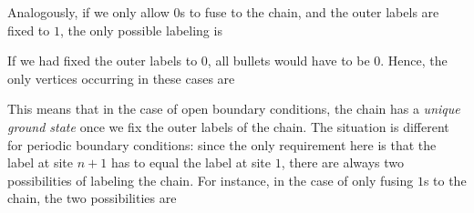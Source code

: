 \noindent
Analogously, if we only allow $0$s to fuse to the chain, and the outer labels are fixed to $1$, the only possible labeling is 
	\begin{figure}[H]
	\end{figure}
	\noindent
If we had fixed the outer labels to $0$, all bullets would have to be $0$. Hence, the only vertices occurring in these cases are
	\begin{figure}[H]	
		\hspace{20pt}
	\end{figure}
\noindent
This means that in the case of open boundary conditions, the chain has a \emph{unique ground state} once we fix the outer labels of the chain. The situation is different for periodic boundary conditions: since the only requirement here is that the label at site $n+1$ has to equal the label at site $1$, there are always two possibilities of labeling the chain. For instance, in the case of only fusing $1$s to the chain, the two possibilities are
